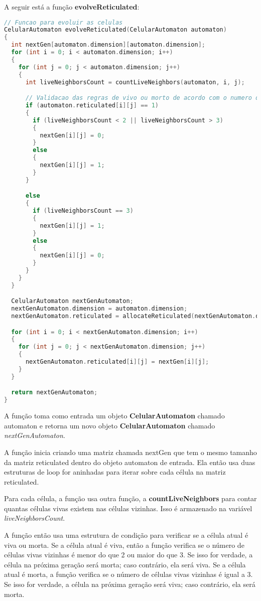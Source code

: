 \documentclass{article}
\begin{document}
\hfill\break
\hfill\break
A seguir está a função \textbf{evolveReticulated}:
 \begin{lstlisting}[caption={Função countLiveNeighbors.},label={lst:cod3},language=C]
 // Funcao para evoluir as celulas
CelularAutomaton evolveReticulated(CelularAutomaton automaton) 
{
  int nextGen[automaton.dimension][automaton.dimension];
  for (int i = 0; i < automaton.dimension; i++)
  {
    for (int j = 0; j < automaton.dimension; j++)
    {
      int liveNeighborsCount = countLiveNeighbors(automaton, i, j);

      // Validacao das regras de vivo ou morto de acordo com o numero de vizinhos
      if (automaton.reticulated[i][j] == 1)
      {
        if (liveNeighborsCount < 2 || liveNeighborsCount > 3)
        {
          nextGen[i][j] = 0;
        }
        else
        {
          nextGen[i][j] = 1;
        }
      }

      else
      {
        if (liveNeighborsCount == 3)
        {
          nextGen[i][j] = 1;
        }
        else
        {
          nextGen[i][j] = 0;
        }
      }
    }
  }

  CelularAutomaton nextGenAutomaton;
  nextGenAutomaton.dimension = automaton.dimension;
  nextGenAutomaton.reticulated = allocateReticulated(nextGenAutomaton.dimension);

  for (int i = 0; i < nextGenAutomaton.dimension; i++)
  {
    for (int j = 0; j < nextGenAutomaton.dimension; j++)
    {
      nextGenAutomaton.reticulated[i][j] = nextGen[i][j];
    }
  }

  return nextGenAutomaton;
}
 \end{lstlisting}
 
 A função toma como entrada um objeto \textbf{CelularAutomaton} chamado automaton e retorna um novo objeto \textbf{CelularAutomaton} chamado \textit{nextGenAutomaton}.

A função inicia criando uma matriz chamada nextGen que tem o mesmo tamanho da matriz reticulated dentro do objeto automaton de entrada. Ela então usa duas estruturas de loop for aninhadas para iterar sobre cada célula na matriz reticulated.

Para cada célula, a função usa outra função, a \textbf{countLiveNeighbors} para contar quantas células vivas existem nas células vizinhas. Isso é armazenado na variável \textit{liveNeighborsCount}.

A função então usa uma estrutura de condição para verificar se a célula atual é viva ou morta. Se a célula atual é viva, então a função verifica se o número de células vivas vizinhas é menor do que 2 ou maior do que 3. Se isso for verdade, a célula na próxima geração será morta; caso contrário, ela será viva. Se a célula atual é morta, a função verifica se o número de células vivas vizinhas é igual a 3. Se isso for verdade, a célula na próxima geração será viva; caso contrário, ela será morta.
\end{document}
